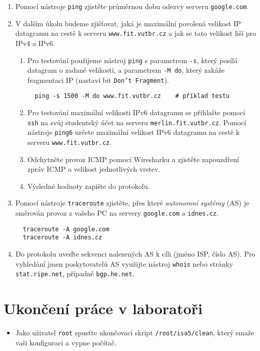 \documentclass[a4paper,11pt]{article}
\begin{document}
\begin{enumerate}
  \item Pomocí nástroje \texttt{ping} zjistěte průměrnou dobu odezvy serveru \texttt{google.com}.
  \item V dalším úkolu budeme zjišťovat, jaká je maximální povolená velikost IP datagramu na cestě k serveru \texttt{www.fit.vutbr.cz} a jak se tato velikost liší pro IPv4 a IPv6.
  \begin{enumerate}
    \item Pro testování použijeme nástroj {\tt ping} s parametrem \texttt{-s}, který posílá datagram o zadané velikosti, a parametrem \texttt{-M do}, který zakáže fragmentaci IP (nastaví bit \texttt{Don't Fragment}).
\begin{verbatim}
  ping -s 1500 -M do www.fit.vutbr.cz    # příklad testu        
\end{verbatim}
    \item Pro testování maximální velikosti IPv6 datagramu se přihlašte pomocí {\tt ssh} na svůj studentský účet na serveru {\tt merlin.fit.vutbr.cz}. Pomocí nástroje {\tt ping6} určete maximální velikost IPv6 datagramu na cestě k serveru \texttt{www.fit.vutbr.cz}.
    \item Odchytněte provoz ICMP pomocí Wiresharku a zjistěte zapouzdření zpráv ICMP a velikost jednotlivých vrstev.
    \item Výsledné hodnoty zapište do protokolu. 
  \end{enumerate}
  \item Pomocí nástroje \texttt{traceroute} zjistěte, přes které {\em autonomní systémy} (AS) je směrován provoz z vašeho PC na servery \texttt{google.com} a \texttt{idnes.cz}.
\begin{verbatim}
  traceroute -A google.com
  traceroute -A idnes.cz
\end{verbatim}
  \item Do protokolu uveďte sekvenci nalezených AS k cíli (jméno ISP, číslo AS). Pro vyhledání jmen poskytovatelů AS využijte nástroj {\tt whois} nebo stránky \texttt{stat.ripe.net}, případně \texttt{bgp.he.net}.
\end{enumerate}

\section*{Ukončení práce v laboratoři}
\begin{itemize}
  \item Jako uživatel {\tt root} spusťte ukončovací skript {\tt /root/isa5/clean}, který smaže vaši konfiguraci a vypne počítač. 
\end{itemize}
\end{document}
